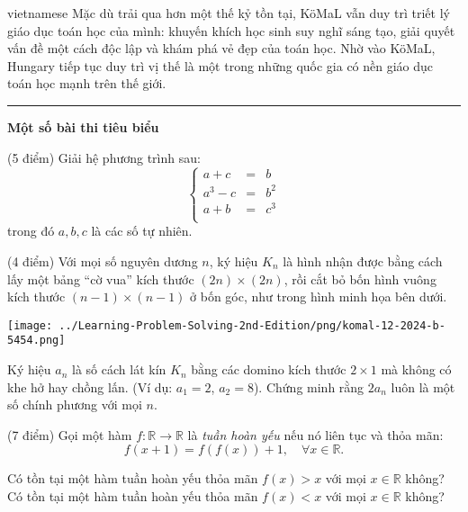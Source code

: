 \documentclass{article}
\begin{document}
\begin{otherlanguage*}{vietnamese}
Mặc dù trải qua hơn một thế kỷ tồn tại, KöMaL vẫn duy trì triết lý giáo dục toán học của mình: khuyến khích học sinh suy nghĩ sáng tạo,
giải quyết vấn đề một cách độc lập và khám phá vẻ đẹp của toán học. Nhờ vào KöMaL, Hungary tiếp tục duy trì vị thế là một trong những quốc gia có nền giáo dục toán học mạnh trên thế giới.

\bigbreak

\noindent\rule{16.5cm}{0.4pt}

\textbf{Một số bài thi tiêu biểu}

\bigbreak

\begin{problem*}
    (5 điểm) Giải hệ phương trình sau:
    \[
        \left\{
            \begin{array}{rcl}
                a + c &=& b\\
                a^3 - c &=& b^2\\
                a + b &=& c^3\\
            \end{array}
        \right.
    \]
    trong đó \( a, b, c \) là các số tự nhiên. 
\end{problem*}

\begin{problem*}
    (4 điểm) Với mọi số nguyên dương \( n \), ký hiệu \( K_n \) là hình nhận được bằng cách lấy một bảng ``cờ vua'' kích thước \( (2n) \times (2n) \),
    rồi cắt bỏ bốn hình vuông kích thước \( (n-1) \times (n-1) \) ở bốn góc, như trong hình minh họa bên dưới.
    \begin{center}
        \texttt{[image: ../Learning-Problem-Solving-2nd-Edition/png/komal-12-2024-b-5454.png]}
    \end{center}
    
    Ký hiệu \( a_n \) là số cách lát kín \( K_n \) bằng các domino kích thước \( 2 \times 1 \) mà không có khe hở hay chồng lấn. (Ví dụ: \( a_1 = 2 \), \( a_2 = 8 \)).  
    Chứng minh rằng \( 2a_n \) luôn là một số chính phương với mọi \( n \).
\end{problem*}

\begin{problem*}
    (7 điểm) Gọi một hàm \( f: \mathbb{R} \to \mathbb{R} \) là \textit{tuần hoàn yếu} nếu nó liên tục và thỏa mãn:
    \[
        f(x+1) = f(f(x)) + 1, \quad \forall x \in \mathbb{R}.
    \]
    
    \begin{enumerate}[topsep=0pt, partopsep=0pt, itemsep=0pt]
        \ii Có tồn tại một hàm tuần hoàn yếu thỏa mãn \( f(x) > x \) với mọi \( x \in \mathbb{R} \) không?  
        \ii Có tồn tại một hàm tuần hoàn yếu thỏa mãn \( f(x) < x \) với mọi \( x \in \mathbb{R} \) không?
    \end{enumerate}
\end{problem*}


\end{otherlanguage*}
\end{document}
